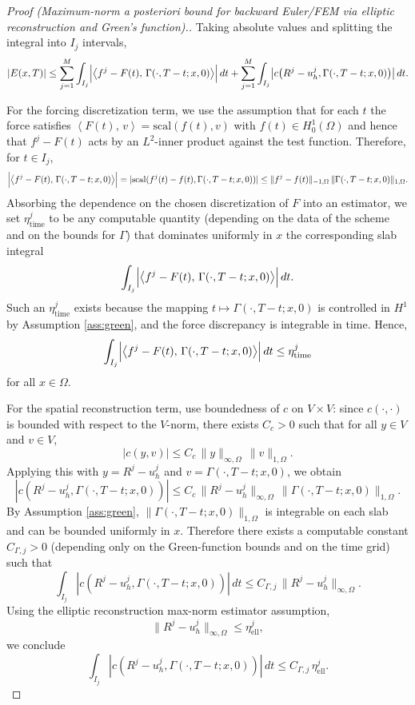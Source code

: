 \documentclass{article}
\newcommand{\dual}[2]{\left\langle #1,\,#2\right\rangle}
\begin{document}
\begin{proof}[Proof (Maximum-norm a posteriori bound for backward Euler/FEM via elliptic reconstruction and Green’s function).]
Taking absolute values and splitting the integral into $I_j$ intervals,
\[
|E(x,T)|\le \sum_{j=1}^M \int_{I_j} \Bigl|\dual{f^j-F(t)}{\Gamma(\cdot,T-t;x,0)}\Bigr|\,dt
+\sum_{j=1}^M \int_{I_j} \bigl|c\bigl(R^j-u_h^j,\Gamma(\cdot,T-t;x,0)\bigr)\bigr|\,dt.
\]

For the forcing discretization term, we use the assumption that for each $t$ the force satisfies $\dual{F(t)}{v}=\mathrm{scal}(f(t),v)$ with $f(t)\in H^1_0(\Omega)$ and hence that $f^j-F(t)$ acts by an $L^2$-inner product against the test function. Therefore, for $t\in I_j$,
\[
\Bigl|\dual{f^j-F(t)}{\Gamma(\cdot,T-t;x,0)}\Bigr|
=|\mathrm{scal}(f^j(t)-f(t),\Gamma(\cdot,T-t;x,0))|
\le \|f^j-f(t)\|_{-1,\Omega}\,\|\Gamma(\cdot,T-t;x,0)\|_{1,\Omega}.
\]
Absorbing the dependence on the chosen discretization of $F$ into an estimator, we set $\eta^j_{\mathrm{time}}$ to be any computable quantity (depending on the data of the scheme and on the bounds for $\Gamma$) that dominates uniformly in $x$ the corresponding slab integral
\[
\int_{I_j} \Bigl|\dual{f^j-F(t)}{\Gamma(\cdot,T-t;x,0)}\Bigr|\,dt.
\]
Such an $\eta^j_{\mathrm{time}}$ exists because the mapping $t\mapsto \Gamma(\cdot,T-t;x,0)$ is controlled in $H^1$ by Assumption \ref{ass:green}, and the force discrepancy is integrable in time. Hence,
\[
\int_{I_j} \Bigl|\dual{f^j-F(t)}{\Gamma(\cdot,T-t;x,0)}\Bigr|\,dt\le \eta^j_{\mathrm{time}}
\]
for all $x\in\Omega$.

For the spatial reconstruction term, use boundedness of $c$ on $V\times V$: since $c(\cdot,\cdot)$ is bounded with respect to the $V$-norm, there exists $C_c>0$ such that for all $y\in V$ and $v\in V$,
\[
|c(y,v)|\le C_c\,\|y\|_{\infty,\Omega}\,\|v\|_{1,\Omega}.
\]
Applying this with $y=R^j-u_h^j$ and $v=\Gamma(\cdot,T-t;x,0)$, we obtain
\[
|c(R^j-u_h^j,\Gamma(\cdot,T-t;x,0))|\le C_c\,\|R^j-u_h^j\|_{\infty,\Omega}\,\|\Gamma(\cdot,T-t;x,0)\|_{1,\Omega}.
\]
By Assumption \ref{ass:green}, $\|\Gamma(\cdot,T-t;x,0)\|_{1,\Omega}$ is integrable on each slab and can be bounded uniformly in $x$. Therefore there exists a computable constant $C_{\Gamma,j}>0$ (depending only on the Green-function bounds and on the time grid) such that
\[
\int_{I_j} |c(R^j-u_h^j,\Gamma(\cdot,T-t;x,0))|\,dt\le C_{\Gamma,j}\,\|R^j-u_h^j\|_{\infty,\Omega}.
\]
Using the elliptic reconstruction max-norm estimator assumption,
\[
\|R^j-u_h^j\|_{\infty,\Omega}\le \eta^j_{\mathrm{ell}},
\]
we conclude
\[
\int_{I_j} |c(R^j-u_h^j,\Gamma(\cdot,T-t;x,0))|\,dt\le C_{\Gamma,j}\,\eta^j_{\mathrm{ell}}.
\]


\end{proof}
\end{document}
